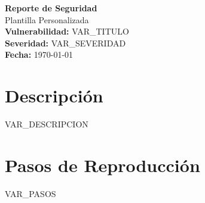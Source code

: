 \documentclass[11pt, a4paper]{article}
\begin{document}
\begin{center}
    {\Huge \textbf{Reporte de Seguridad}} \\[1cm]
    {\Large Plantilla Personalizada} \\[2cm]

    \textbf{Vulnerabilidad:} VAR_TITULO \\[0.5cm]
    \textbf{Severidad:} VAR_SEVERIDAD \\[0.5cm]
    \textbf{Fecha:} \today
\end{center}

\vspace{2cm}

\section*{Descripción}
VAR_DESCRIPCION

\section*{Pasos de Reproducción}
VAR_PASOS
\end{document}
